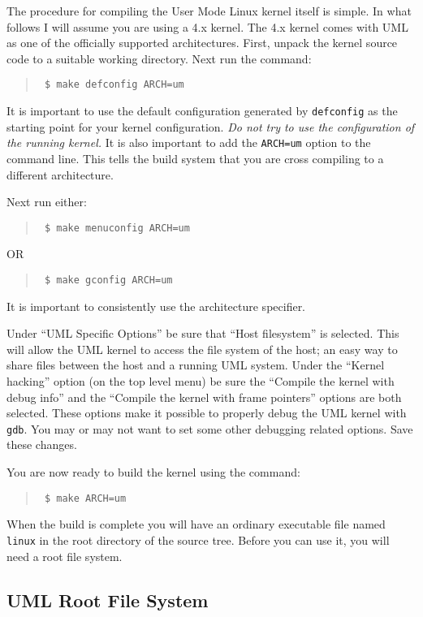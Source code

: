 \documentclass{article}
\newcommand{\command}[1]{\texttt{#1}}
\newenvironment{commands}
  {\begin{quote} \tt}
  {\end{quote}}
\begin{document}
The procedure for compiling the User Mode Linux kernel itself is simple. In what follows I will
assume you are using a 4.x kernel. The 4.x kernel comes with UML as one of the officially
supported architectures. First, unpack the kernel source code to a suitable working directory.
Next run the command:
\begin{commands}
  \$ make defconfig ARCH=um
\end{commands}

It is important to use the default configuration generated by \command{defconfig} as the
starting point for your kernel configuration. \emph{Do not try to use the configuration of the
  running kernel.} It is also important to add the \command{ARCH=um} option to the command line.
This tells the build system that you are cross compiling to a different architecture.

Next run either:
\begin{commands}
  \$ make menuconfig ARCH=um
\end{commands}
OR
\begin{commands}
  \$ make gconfig ARCH=um
\end{commands}

It is important to consistently use the architecture specifier.

Under ``UML Specific Options'' be sure that ``Host filesystem'' is selected. This will allow the
UML kernel to access the file system of the host; an easy way to share files between the host
and a running UML system. Under the ``Kernel hacking'' option (on the top level menu) be sure
the ``Compile the kernel with debug info'' and the ``Compile the kernel with frame pointers''
options are both selected. These options make it possible to properly debug the UML kernel with
\command{gdb}. You may or may not want to set some other debugging related options. Save these
changes.

You are now ready to build the kernel using the command:
\begin{commands}
  \$ make ARCH=um
\end{commands}

When the build is complete you will have an ordinary executable file named \command{linux} in
the root directory of the source tree. Before you can use it, you will need a root file system.

\subsection{UML Root File System}
\end{document}
